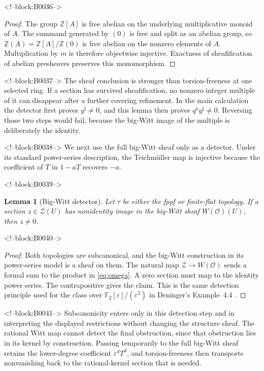 \documentclass[11pt]{article}
\newtheorem{lemma}[theorem]{Lemma}
\theoremstyle{definition}
\newcommand{\Wbig}{W}
\newcommand{\Zpre}{\underline{\mathbb Z}}
\newcommand{\Zsh}{\mathcal Z}
\newcommand{\sh}{\sharp}
\begin{document}
<!--block:B0036-->
\begin{proof}
The group \(\mathbb Z[A]\) is free abelian on the underlying multiplicative
monoid of \(A\).  The summand generated by \((0)\) is free and split as an
abelian group, so \(\Zpre(A)=\mathbb Z[A]/\mathbb Z(0)\) is free abelian on
the nonzero elements of \(A\).  Multiplication by \(m\) is therefore
objectwise injective.  Exactness of sheafification of abelian presheaves
preserves this monomorphism.
\end{proof}

<!--block:B0037-->
The sheaf conclusion is stronger than torsion-freeness at one selected
ring.  If a section has survived sheafification, no nonzero integer
multiple of it can disappear after a further covering refinement.  In the
main calculation the detector first proves \(y^\sh\ne0\), and this lemma
then proves \(q^a y^\sh\ne0\).  Reversing those two steps would fail,
because the big-Witt image of the multiple is deliberately the identity.

<!--block:B0038-->
We next use the full big-Witt sheaf only as a detector.  Under its standard
power-series description, the Teichm\"uller map is injective because the
coefficient of \(T\) in \(1-aT\) recovers \(-a\).

<!--block:B0039-->
\begin{lemma}[Big-Witt detector]\label{lem:detector}
Let \(\tau\) be either the fppf or finite-flat topology.  If a section
\(z\in\Zsh(U)\) has nonidentity image in the big-Witt sheaf
\(\Wbig(\mathcal O)(U)\), then \(z\ne0\).
\end{lemma}

<!--block:B0040-->
\begin{proof}
Both topologies are subcanonical, and the big-Witt construction in its
power-series model is a sheaf on them.  The natural map
\(\Zsh\to\Wbig(\mathcal O)\) sends a formal sum to the product in
\eqref{eq:omega}.  A zero section must map to the identity power series.
The contrapositive gives the claim.  This is the same detection principle
used for the class over
\(\mathbb F_2[\varepsilon]/(\varepsilon^2)\) in Deninger's
Example~4.4 \cite[p.~22]{Deninger2025Rational}.
\end{proof}

<!--block:B0041-->
Subcanonicity enters only in this detection step and in interpreting the
displayed restrictions without changing the structure sheaf.  The
rational Witt map cannot detect the final obstruction, since that
obstruction lies in its kernel by construction.  Passing temporarily to
the full big-Witt sheaf retains the lower-degree coefficient
\(\varepsilon^dT^d\), and torsion-freeness then transports nonvanishing
back to the rational-kernel section that is needed.
\end{document}
